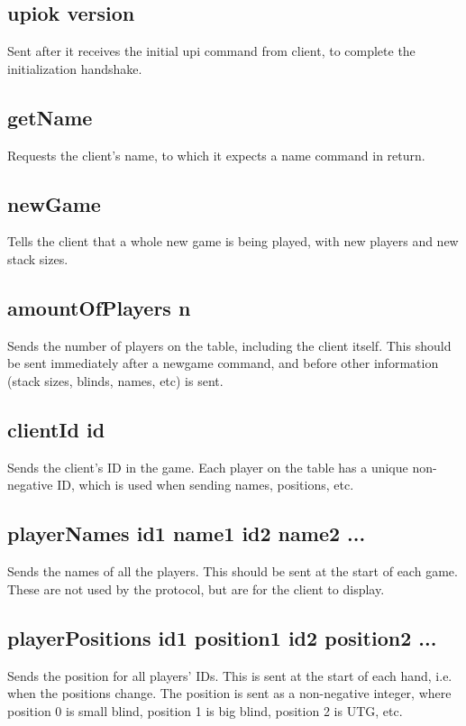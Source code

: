 \documentclass{article}
\begin{document}
\subsection{upiok \textlangle{}version\textrangle{}}
Sent after it receives the initial upi command from client, to complete the initialization handshake.

\subsection{getName}
Requests the client's name, to which it expects a name command in return.

\subsection{newGame}
Tells the client that a whole new game is being played, with new players and new stack sizes. 

\subsection{amountOfPlayers \textlangle{}n\textrangle{}}
Sends the number of players on the table, including the client itself. This should be sent immediately after a newgame command, and before other information (stack sizes, blinds, names, etc) is sent.

\subsection{clientId \textlangle{}id\textrangle{}}
Sends the client's ID in the game. Each player on the table has a unique non-negative ID, which is used when sending names, positions, etc.

\subsection{playerNames \textlangle{}id1 name1\textrangle{} \textlangle{}id2 name2\textrangle{} ... }
Sends the names of all the players. This should be sent at the start of each game. These are not used by the protocol, but are for the client to display.

\subsection{playerPositions \textlangle{}id1 position1\textrangle{} \textlangle{}id2 position2\textrangle{} ... }
Sends the position for all players' IDs. This is sent at the start of each hand, i.e. when the positions change. The position is sent as a non-negative integer, where position 0 is small blind, position 1 is big blind, position 2 is UTG, etc.
\end{document}
